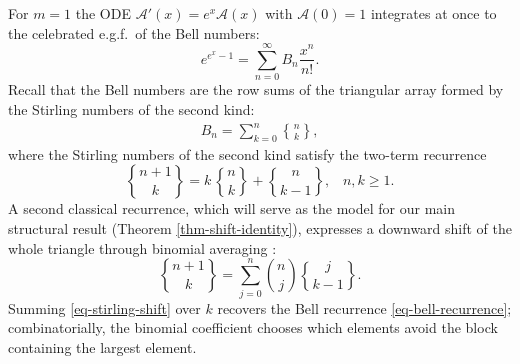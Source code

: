 \documentclass[a4paper]{amsart}
\numberwithin{equation}{section}
\newcommand{\Stirling}[0]{\genfrac\{\}{0pt}{}}
\begin{document}
For $m=1$ the ODE $\mathcal{A}'(x) = e^{x}\mathcal{A}(x)$ with $\mathcal{A}(0)=1$ integrates at once to the celebrated e.g.f.\ of the Bell numbers:
%
\begin{equation}\label{eq-bell-egf}
    e^{e^x-1} = \sum_{n=0}^{\infty} B_n \frac{x^n}{n!}.
\end{equation}
%
Recall that the Bell numbers are the row sums of the triangular array formed by the Stirling numbers of the second kind:
\begin{align*}
B_n = \sum_{k=0}^{n}\genfrac\{\}{0pt}{}{n}{k},
\end{align*}
where the Stirling numbers of the second kind satisfy the two-term recurrence
%
\[
\genfrac\{\}{0pt}{}{n+1}{k} = k \, \genfrac\{\}{0pt}{}{n}{k} + \genfrac\{\}{0pt}{}{n}{k-1}, \,\,\,\,\, n, k \ge 1.
\]
%
A second classical recurrence, which will serve as the model for our main structural result (Theorem \ref{thm-shift-identity}), expresses a downward shift of the whole triangle through binomial averaging \cite{comtet1974, graham_concrete_nodate}:
%
\begin{equation}\label{eq-stirling-shift}
\Stirling{n+1}{k} = \sum_{j=0}^{n}\binom{n}{j}\Stirling{j}{k-1}.
\end{equation}
%
Summing \eqref{eq-stirling-shift} over $k$ recovers the Bell recurrence \eqref{eq-bell-recurrence}; combinatorially, the binomial coefficient chooses which elements avoid the block containing the largest element.
\end{document}
